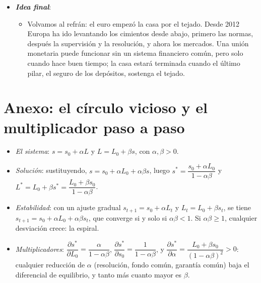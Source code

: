 \documentclass[11pt]{article}
\begin{document}
\begin{itemize}
\begin{itemize}
  \item La calma de estos años no es razón para esperar. Lo advirtió  (1982): «la estabilidad, o la tranquilidad, en un mundo con un pasado cíclico y con instituciones financieras capitalistas es desestabilizadora»\footnote{En el original, \textcite{Minsky1982CanIt}, p.~101: «Stability---or tranquility---in a world with a cyclical past and capitalist financial institutions is destabilizing».}.
  \end{itemize}
\item \textbf{\emph{Idea final}}:
  \begin{itemize}
  \item Volvamos al refrán: el euro empezó la casa por el tejado. Desde 2012 Europa ha ido levantando los cimientos desde abajo, primero las normas, después la supervisión y la resolución, y ahora los mercados. Una unión monetaria puede funcionar sin un sistema financiero común, pero solo cuando hace buen tiempo; la casa estará terminada cuando el último pilar, el seguro de los depósitos, sostenga el tejado.
  \end{itemize}
\end{itemize}

\clearpage
\appendix

\section{Anexo: el círculo vicioso\cortetitulo{} y el multiplicador paso a paso}\label{anexo:bucle}

\begin{itemize}
\item \emph{El sistema}: $s=s_0+\alpha L$ y $L=L_0+\beta s$, con $\alpha,\beta>0$.
\item \emph{Solución}: sustituyendo, $s=s_0+\alpha L_0+\alpha\beta s$, luego $s^*=\dfrac{s_0+\alpha L_0}{1-\alpha\beta}$ y $L^*=L_0+\beta s^*=\dfrac{L_0+\beta s_0}{1-\alpha\beta}$.
\item \emph{Estabilidad}: con un ajuste gradual $s_{t+1}=s_0+\alpha L_t$ y $L_t=L_0+\beta s_t$, se tiene $s_{t+1}=s_0+\alpha L_0+\alpha\beta s_t$, que converge si y solo si $\alpha\beta<1$. Si $\alpha\beta\geq 1$, cualquier desviación crece: la espiral.
\item \emph{Multiplicadores}: $\dfrac{\partial s^*}{\partial L_0}=\dfrac{\alpha}{1-\alpha\beta}$, $\dfrac{\partial s^*}{\partial s_0}=\dfrac{1}{1-\alpha\beta}$, y $\dfrac{\partial s^*}{\partial\alpha}=\dfrac{L_0+\beta s_0}{(1-\alpha\beta)^2}>0$: cualquier reducción de $\alpha$ (resolución, fondo común, garantía común) baja el diferencial de equilibrio, y tanto más cuanto mayor es $\beta$.\findemo
\end{itemize}
\end{document}
